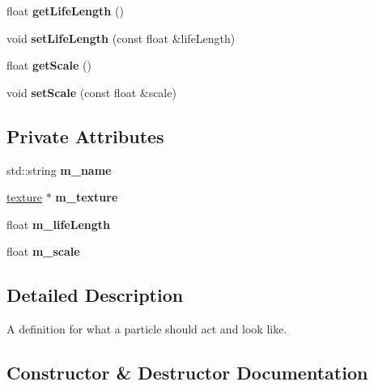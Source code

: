 \begin{DoxyCompactItemize}
float {\bfseries get\+Life\+Length} ()
\item 
\mbox{\label{classflounder_1_1particletype_a01d97f30aa6b1a1c2f248431e4d236fb}} 
void {\bfseries set\+Life\+Length} (const float \&life\+Length)
\item 
\mbox{\label{classflounder_1_1particletype_a3fd7f88a4e7a21cfe06b25c1f3191a9d}} 
float {\bfseries get\+Scale} ()
\item 
\mbox{\label{classflounder_1_1particletype_a98be507fc1eb62a9da8c6e509bf33c41}} 
void {\bfseries set\+Scale} (const float \&scale)
\end{DoxyCompactItemize}
\subsection*{Private Attributes}
\begin{DoxyCompactItemize}
\item 
\mbox{\label{classflounder_1_1particletype_a9e0af59d17e158d1dfbcf675ba30a656}} 
std\+::string {\bfseries m\+\_\+name}
\item 
\mbox{\label{classflounder_1_1particletype_a501497841e3a143f0528442b0ae63c00}} 
\hyperlink{classflounder_1_1texture}{texture} $\ast$ {\bfseries m\+\_\+texture}
\item 
\mbox{\label{classflounder_1_1particletype_a75f73f4f68b5c2e70a4dba9e5f575aaf}} 
float {\bfseries m\+\_\+life\+Length}
\item 
\mbox{\label{classflounder_1_1particletype_a30abddd469d5e4537a662a78df452a69}} 
float {\bfseries m\+\_\+scale}
\end{DoxyCompactItemize}


\subsection{Detailed Description}
A definition for what a particle should act and look like. 



\subsection{Constructor \& Destructor Documentation}
\mbox{\label{classflounder_1_1particletype_a5b67bec1305e49290ee3d7d4a318512d}} 
